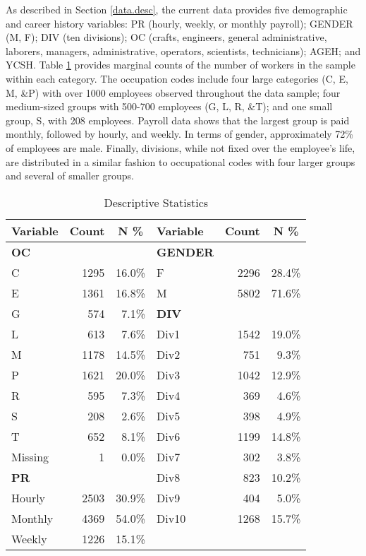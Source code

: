 As described in Section \ref{data.desc}, the current data provides five demographic and career history variables: PR (hourly, weekly, or monthly payroll); GENDER (M, F); DIV (ten divisions); OC (crafts, engineers, general administrative, laborers, managers, administrative, operators, scientists, technicians); AGEH; and YCSH. Table \ref{tab:descriptive} provides marginal counts of the number of workers in the sample within each category. The occupation codes include four large categories (C, E, M, \&P)  with over 1000 employees observed throughout the data sample; four medium-sized groups with 500-700 employees (G, L, R, \&T); and one small group, S, with 208 employees. Payroll data shows that the largest group is paid monthly, followed by hourly, and weekly. In terms of gender, approximately 72\% of employees are male. Finally, divisions, while not fixed over the employee's life, are distributed in a similar fashion to occupational codes with four larger groups and several of smaller groups.
\begin{table}[htbp]
	\centering
	\scriptsize
	\renewcommand{\arraystretch}{1.2}
	\caption{Descriptive Statistics}
	\begin{tabular}{lrrlrr}
		\toprule
		\textbf{Variable}	& \multicolumn{1}{c}{\textbf{Count}} & \multicolumn{1}{c}{\textbf{N \%}}  &   \textbf{Variable}    & \multicolumn{1}{c}{\textbf{Count}} & \multicolumn{1}{c}{\textbf{N \%}} \\
		\midrule
		\textbf{OC} &       &       & \textbf{GENDER} &       &  \\
		C     & 1295  & 16.0\% & F     & 2296  & 28.4\% \\
		E     & 1361  & 16.8\% & M     & 5802  & 71.6\% \\
		G     & 574   & 7.1\% & \textbf{DIV} &       &  \\
		L     & 613   & 7.6\% & Div1 & 1542  & 19.0\% \\
		M     & 1178  & 14.5\% & Div2 & 751   & 9.3\% \\
		P     & 1621  & 20.0\% & Div3 & 1042  & 12.9\% \\
		R     & 595   & 7.3\% & Div4 & 369   & 4.6\% \\
		S     & 208   & 2.6\% & Div5 & 398   & 4.9\% \\
		T     & 652   & 8.1\% & Div6 & 1199  & 14.8\% \\
		Missing & 1     & 0.0\% & Div7 & 302   & 3.8\% \\
		\textbf{PR} &  &   & Div8 & 823   & 10.2\% \\
		Hourly & 2503  & 30.9\% & Div9 & 404   & 5.0\% \\
		Monthly & 4369  & 54.0\% & Div10 & 1268  & 15.7\% \\
		Weekly & 1226  & 15.1\% &       &       &  \\
		\bottomrule
	\end{tabular}%
	\label{tab:descriptive}%
\end{table}%

